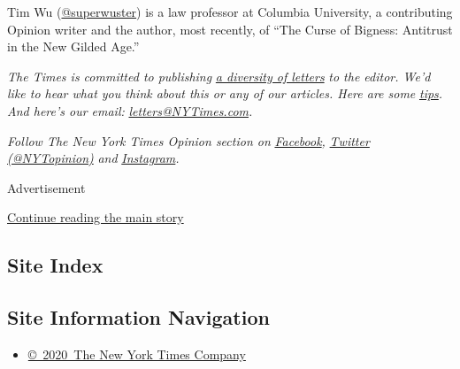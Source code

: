 Tim Wu (\href{https://twitter.com/superwuster}{@superwuster}) is a law
professor at Columbia University, a contributing Opinion writer and the
author, most recently, of ``The Curse of Bigness: Antitrust in the New
Gilded Age.''

\emph{The Times is committed to publishing}
\href{https://www.nytimes3xbfgragh.onion/2019/01/31/opinion/letters/letters-to-editor-new-york-times-women.html}{\emph{a
diversity of letters}} \emph{to the editor. We'd like to hear what you
think about this or any of our articles. Here are some}
\href{https://help.nytimes3xbfgragh.onion/hc/en-us/articles/115014925288-How-to-submit-a-letter-to-the-editor}{\emph{tips}}\emph{.
And here's our email:}
\href{mailto:letters@NYTimes.com}{\emph{letters@NYTimes.com}}\emph{.}

\emph{Follow The New York Times Opinion section on}
\href{https://www.facebookcorewwwi.onion/nytopinion}{\emph{Facebook}}\emph{,}
\href{http://twitter.com/NYTOpinion}{\emph{Twitter (@NYTopinion)}}
\emph{and}
\href{https://www.instagram.com/nytopinion/}{\emph{Instagram}}\emph{.}

Advertisement

\protect\hyperlink{after-bottom}{Continue reading the main story}

\hypertarget{site-index}{%
\subsection{Site Index}\label{site-index}}

\hypertarget{site-information-navigation}{%
\subsection{Site Information
Navigation}\label{site-information-navigation}}

\begin{itemize}
\tightlist
\item
  \href{https://help.nytimes3xbfgragh.onion/hc/en-us/articles/115014792127-Copyright-notice}{©~2020~The
  New York Times Company}
\end{itemize}

